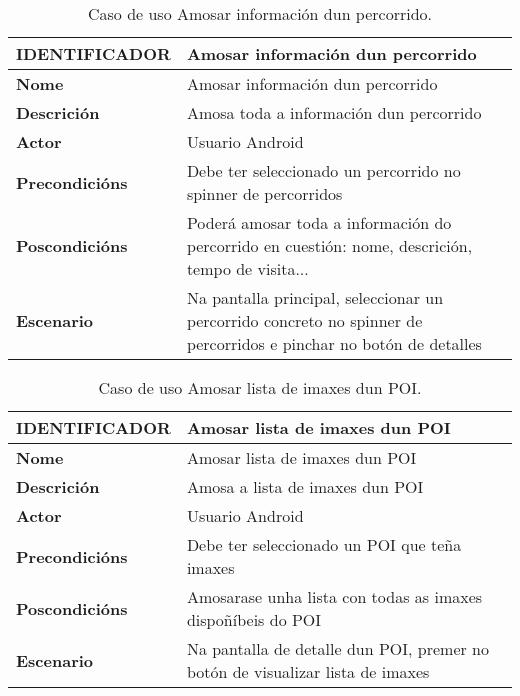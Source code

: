 \begin{table}[tbh]
	\begin{tabular}{|l|p{10cm}|}
		\hline 
		\textbf{IDENTIFICADOR}	& \textbf{Amosar información dun percorrido} \\ 
		\hline 
		\textbf{Nome} & Amosar información dun percorrido \\ 
		\hline 
		\textbf{Descrición} & Amosa toda a información dun percorrido \\ 
		\hline 
		\textbf{Actor} & Usuario Android \\ 
		\hline 
		\textbf{Precondicións} & Debe ter seleccionado un percorrido no spinner de percorridos \\ 
		\hline 
		\textbf{Poscondicións} & Poderá amosar toda a información do percorrido en cuestión: nome, descrición, tempo de visita... \\ 
		\hline 
		\textbf{Escenario} & Na pantalla principal, seleccionar un percorrido concreto no spinner de percorridos e pinchar no botón de detalles \\ 
		\hline 
	\end{tabular}
	\caption{Caso de uso Amosar información dun percorrido.}
	\label{tab:cuAmosarPercorrido}
\end{table}

\begin{table}[tbh]
	\begin{tabular}{|l|p{10cm}|}
		\hline 
		\textbf{IDENTIFICADOR}	& \textbf{Amosar lista de imaxes dun POI} \\ 
		\hline 
		\textbf{Nome} & Amosar lista de imaxes dun POI \\ 
		\hline 
		\textbf{Descrición} & Amosa a lista de imaxes dun POI \\ 
		\hline 
		\textbf{Actor} & Usuario Android \\ 
		\hline 
		\textbf{Precondicións} & Debe ter seleccionado un POI que teña imaxes \\ 
		\hline 
		\textbf{Poscondicións} & Amosarase unha lista con todas as imaxes dispoñíbeis do POI \\ 
		\hline 
		\textbf{Escenario} & Na pantalla de detalle dun POI, premer no botón de visualizar lista de imaxes \\ 
		\hline 
	\end{tabular}
	\caption{Caso de uso Amosar lista de imaxes dun POI.}
	\label{tab:cuAmosarListaImaxePOI}
\end{table}

